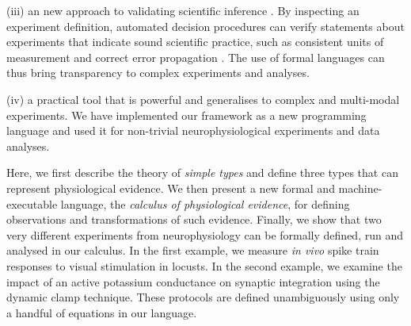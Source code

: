 (iii) an new approach to validating scientific inference
\citep{Editors2003, Editors2010, DeSchutter2010}. By inspecting an
experiment definition, automated decision procedures can verify
statements about experiments that indicate sound scientific practice,
such as consistent units of measurement \citep{Kennedy1997} and
correct error propagation \citep{Taylor1997}. The use of formal
languages can thus bring transparency to complex experiments and
analyses.

(iv) a practical tool that is powerful and generalises to complex and
multi-modal experiments. We have implemented our framework as a new
programming language and used it for non-trivial neurophysiological
experiments and data analyses.

Here, we first describe the theory of \emph{simple types}
\citep{Pierce2002} and define three types that can represent
physiological evidence. We then present a new formal and
machine-executable language, the \emph{calculus of physiological
  evidence}, for defining observations and transformations of such
evidence. Finally, we show that two very different experiments from
neurophysiology can be formally defined, run and analysed in our
calculus. In the first example, we measure \emph{in vivo} spike train
responses to visual stimulation in locusts. In the second example, we
examine the impact of an active potassium conductance on synaptic
integration using the dynamic clamp technique. These protocols are
defined unambiguously using only a handful of equations in our
language.
